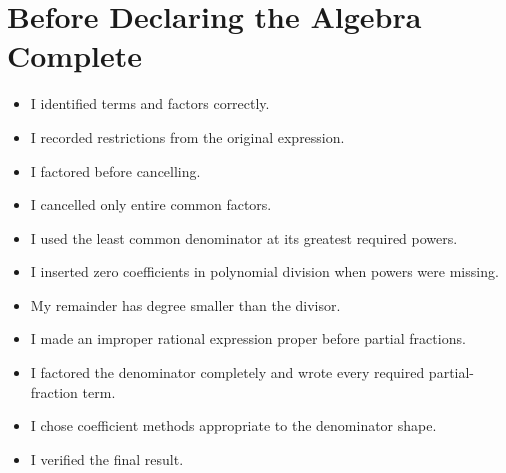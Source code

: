 \documentclass[11pt,oneside]{book}
\begin{document}
\chapter*{Before Declaring the Algebra Complete}
\begin{itemize}[leftmargin=*]
\item I identified terms and factors correctly.
\item I recorded restrictions from the original expression.
\item I factored before cancelling.
\item I cancelled only entire common factors.
\item I used the least common denominator at its greatest required powers.
\item I inserted zero coefficients in polynomial division when powers were missing.
\item My remainder has degree smaller than the divisor.
\item I made an improper rational expression proper before partial fractions.
\item I factored the denominator completely and wrote every required partial-fraction term.
\item I chose coefficient methods appropriate to the denominator shape.
\item I verified the final result.
\end{itemize}
\backmatter
\end{document}
